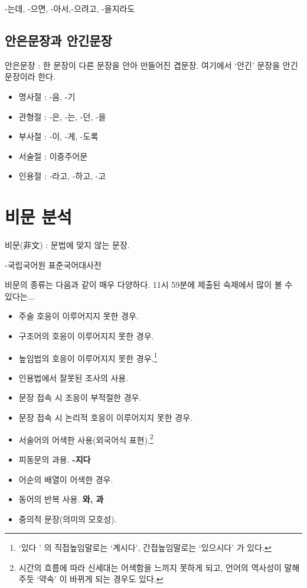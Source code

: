 \documentclass[10pt]{report}
\begin{document}
-는데, -으면, -아서,-으려고, -을지라도
\subsection{안은문장과 안긴문장}
안은문장 : 한 문장이 다른 문장을 안아 만들어진 겹문장. 여기에서 `안긴'  문장을 안긴문장이라 한다.
\begin{itemize}
\item 명사절 : -음, -기
\item 관형절 : -은, -는, -던, -을
\item 부사절 : -이, -게, -도록
\item 서술절 : 이중주어문
\item 인용절 : -라고, -하고, -고
\end{itemize}
\section{비문 분석}
\begin{center}
	비문(非文) : 문법에 맞지 않는 문장.
	\begin{flushright}
		\small -국립국어원 표준국어대사전
	\end{flushright}
\end{center}
비문의 종류는 다음과 같이 매우 다양하다. 11시 59분에 제출된 숙제에서 많이 볼 수 있다는...
\begin{itemize}
\item 주술 호응이 이루어지지 못한 경우.

\item 구조어의 호응이 이루어지지 못한 경우.

\item 높임법의 호응이 이루어지지 못한 경우.\footnote{`있다 ' 의 직접높임말로는 `계시다', 간접높임말로는 `있으시다'  가 있다.}

\item 인용법에서 잘못된 조사의 사용.

\item 문장 접속 시 조응이 부적절한 경우.

\item 문장 접속 시 논리적 호응이 이루어지지 못한 경우.

\item 서술어의 어색한 사용(외국어식 표현).\footnote{시간의 흐름에 따라 신세대는 어색함을 느끼지 못하게 되고, 언어의 역사성이 말해주듯 `약속'  이 바뀌게 되는 경우도 있다.}

\item 피동문의 과용. \textbf{-지다}

\item 어순의 배열이 어색한 경우.

\item 동어의 반복 사용. \textbf{와, 과}

\item 중의적 문장(의미의 모호성).

\end{itemize}
\end{document}
